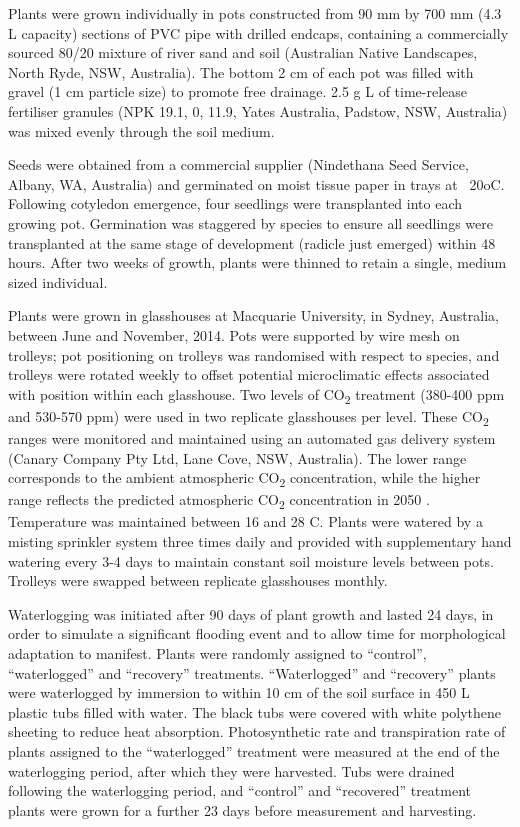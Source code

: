 \documentclass[12pt,a4paper]{memoir}
\begin{document}
Plants were grown individually in pots constructed from 90 mm by 700 mm (4.3 L capacity) sections of PVC pipe with drilled endcaps, containing a commercially sourced 80/20 mixture of river sand and soil (Australian Native Landscapes, North Ryde, NSW, Australia). The bottom 2 cm of each pot was filled with gravel (1 cm particle size) to promote free drainage. 2.5 g L of time-release fertiliser granules (NPK 19.1, 0, 11.9, Yates Australia, Padstow, NSW, Australia) was mixed evenly through the soil medium.

Seeds were obtained from a commercial supplier (Nindethana Seed Service, Albany, WA, Australia) and germinated on moist tissue paper in trays at ~20oC. Following cotyledon emergence, four seedlings were transplanted into each growing pot. Germination was staggered by species to ensure all seedlings were transplanted at the same stage of development (radicle just emerged) within 48 hours. After two weeks of growth, plants were thinned to retain a single, medium sized individual.

Plants were grown in glasshouses at Macquarie University, in Sydney, Australia, between June and November, 2014. Pots were supported by wire mesh on trolleys; pot positioning on trolleys was randomised with respect to species, and trolleys were rotated weekly to offset potential microclimatic effects associated with position within each glasshouse. Two levels of CO\textsubscript{2} treatment (380-400 ppm and 530-570 ppm) were used in two replicate glasshouses per level. These CO\textsubscript{2} ranges were monitored and maintained using an automated gas delivery system (Canary Company Pty Ltd, Lane Cove, NSW, Australia). The lower range corresponds to the ambient atmospheric CO\textsubscript{2} concentration, while the higher range reflects the predicted atmospheric CO\textsubscript{2} concentration in 2050 \citep{IPCC2014}. Temperature was maintained between 16 and 28 C. Plants were watered by a misting sprinkler system three times daily and provided with supplementary hand watering every 3-4 days to maintain constant soil moisture levels between pots. Trolleys were swapped between replicate glasshouses monthly.

Waterlogging was initiated after 90 days of plant growth and lasted 24 days, in order to simulate a significant flooding event and to allow time for morphological adaptation to manifest. Plants were randomly assigned to “control”, “waterlogged” and “recovery” treatments. “Waterlogged” and “recovery” plants were waterlogged by immersion to within 10 cm of the soil surface in 450 L plastic tubs filled with water. The black tubs were covered with white polythene sheeting to reduce heat absorption. Photosynthetic rate and transpiration rate of plants assigned to the “waterlogged” treatment were measured at the end of the waterlogging period, after which they were harvested. Tubs were drained following the waterlogging period, and “control” and “recovered” treatment plants were grown for a further 23 days before measurement and harvesting.
\end{document}
